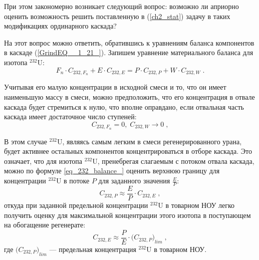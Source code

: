 При этом закономерно возникает следующий вопрос: возможно ли априорно оценить возможность решить поставленную в (\ref{ch2_stat}) задачу в таких модификациях ординарного каскада? 

На этот вопрос можно ответить, обратившись к уравнениям баланса компонентов в каскаде (\ref{GrindEQ__1_21_}). Запишем уравнение материального баланса для изотопа $^{232}$U:
\begin{equation}\label{mat_balance12}
    F_n \cdot C_{232,F_n} + E \cdot C_{232,E} = P \cdot C_{232,P} + W \cdot C_{232,W} \; .
\end{equation}

Учитывая его малую концентрации в исходной смеси и то, что он имеет наименьшую массу в смеси, можно предположить, что его концентрация в отвале каскада будет стремиться к нулю, что вполне оправдано, если отвальная часть каскада имеет достаточное число ступеней:
\begin{equation} \label{mat_balance3} 
  C_{232,F_n}=0 ,\; C_{232,W} \rightarrow 0 \; ,
\end{equation} 

В этом случае $^{232}$U, являясь самым легким в смеси регенерированного урана, будет активнее остальных компонентов концентрироваться в отборе каскада. Это означает, что для изотопа $^{232}$U, пренебрегая слагаемым с потоком отвала каскада, можно по формуле \ref{eq_232_balance_} оценить верхнюю границу для концентрации $^{232}$U в потоке $P$ для заданного значения $\frac{E}{P}$:
\begin{equation}
  \label{eq_232_balance_}
    C_{232,P} \approx \frac{E}{P} \cdot C_{232,E} \; ,
\end{equation}
откуда при заданной предельной концентрации $^{232}$U в товарном НОУ легко получить оценку для максимальной концентрации этого изотопа в поступающем на обогащение регенерате:
\begin{equation}
  \label{eq_232_balance_var2}
    C_{232,E} \approx \frac{P}{E} \cdot {{(}{C_{232,P}}{)}}_{lim} \; ,
  \end{equation}
где ${{(}{C_{232,P}}{)}}_{lim}$ --- предельная концентрация $^{232}$U в товарном НОУ.
  
